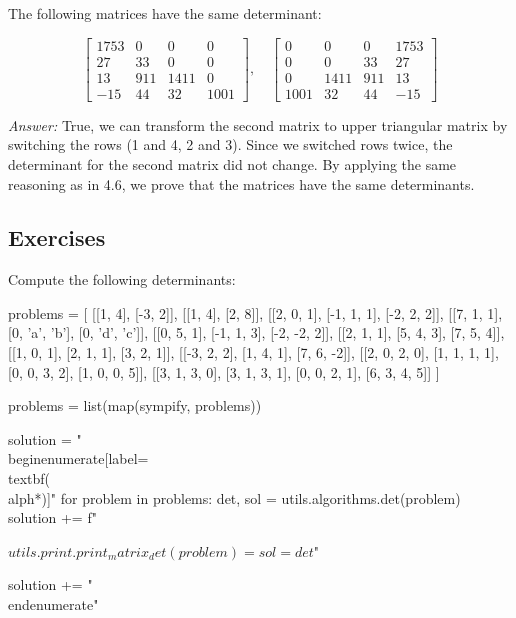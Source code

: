\documentclass[letterpaper]{article}
\newcommand{\ans}{\textit{Answer: }}
\newenvironment{question}[2][Question]{\begin{trivlist}
\item[\hskip \labelsep {\bfseries #1}\hskip \labelsep {\bfseries #2.}]}{\end{trivlist}}
\begin{document}
\begin{question}{4.7}
  The following matrices have the same determinant:

  $$
  \left[ \begin{array}{cccc}{1753} & {0} & {0} & {0} \\ {27} & {33} & {0} & {0} \\ {13} & {911} & {1411} & {0} \\ {-15} & {44} & {32} & {1001}\end{array}\right], \quad \left[ \begin{array}{rrrr}{0} & {0} & {0} & {1753} \\ {0} & {0} & {33} & {27} \\ {0} & {1411} & {911} & {13} \\ {1001} & {32} & {44} & {-15}\end{array}\right]
  $$

  \ans True, we can transform the second matrix to upper triangular matrix by switching the rows (1 and 4, 2 and 3). Since we switched rows twice, the determinant for the second matrix did not change. By applying the same reasoning as in 4.6, we prove that the matrices have the same determinants.
\end{question}

\subsection{Exercises}

\begin{question}{4.1}
  Compute the following determinants:

  \begin{pycode}
problems = [
  [[1, 4], [-3, 2]],
  [[1, 4], [2, 8]],
  [[2, 0, 1], [-1, 1, 1], [-2, 2, 2]],
  [[7, 1, 1], [0, 'a', 'b'], [0, 'd', 'c']],
  [[0, 5, 1], [-1, 1, 3], [-2, -2, 2]],
  [[2, 1, 1], [5, 4, 3], [7, 5, 4]],
  [[1, 0, 1], [2, 1, 1], [3, 2, 1]],
  [[-3, 2, 2], [1, 4, 1], [7, 6, -2]],
  [[2, 0, 2, 0], [1, 1, 1, 1], [0, 0, 3, 2], [1, 0, 0, 5]],
  [[3, 1, 3, 0], [3, 1, 3, 1], [0, 0, 2, 1], [6, 3, 4, 5]]
]

problems = list(map(sympify, problems))

solution = "\\begin{enumerate}[label=\\textbf{(\\alph*)}]\n"
for problem in problems:
  det, sol = utils.algorithms.det(problem)
  solution += f"\item ${utils.print.print_matrix_det(problem)}={sol}={det}$\n"

solution += "\\end{enumerate}\n"
  \end{pycode}
  


\end{question}
\end{document}
